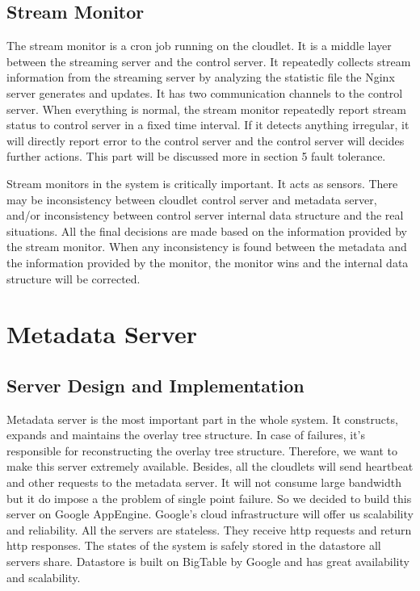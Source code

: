 \documentclass[letterpaper,twocolumn,10pt]{article}
\begin{document}
\subsection{Stream Monitor}

The stream monitor is a cron job running on the cloudlet. It is a middle layer between the streaming server and the control server. It repeatedly collects stream information from the streaming server by analyzing the statistic file the Nginx server generates and updates. It has two communication channels to the control server. When everything is normal, the stream monitor repeatedly report stream status to control server in a fixed time interval. If it detects anything irregular, it will directly report error to the control server and the control server will decides further actions. This part will be discussed more in section 5 fault tolerance. 

Stream monitors in the system is critically important. It acts as sensors. There may be inconsistency between cloudlet control server and metadata server, and/or inconsistency between control server internal data structure and the real situations. All the final decisions are made based on the information provided by the stream monitor. When any inconsistency is found between the metadata and the information provided by the monitor, the monitor wins and the internal data structure will be corrected.


\section{Metadata Server}

\subsection{Server Design and Implementation}
Metadata server is the most important part in the whole system. It constructs, expands and maintains the overlay tree structure. In case of failures, it's responsible for reconstructing the overlay tree structure. Therefore, we want to make this server extremely available. Besides, all the cloudlets will send heartbeat and other requests to the metadata server. It will not consume large bandwidth but it do impose a the problem of single point failure. So we decided to build this server on Google AppEngine. Google's cloud infrastructure will offer us scalability and reliability. All the servers are stateless. They receive http requests and return http responses. The states of the system is safely stored in the datastore all servers share. Datastore is built on BigTable by Google and has great availability and scalability.
\end{document}
